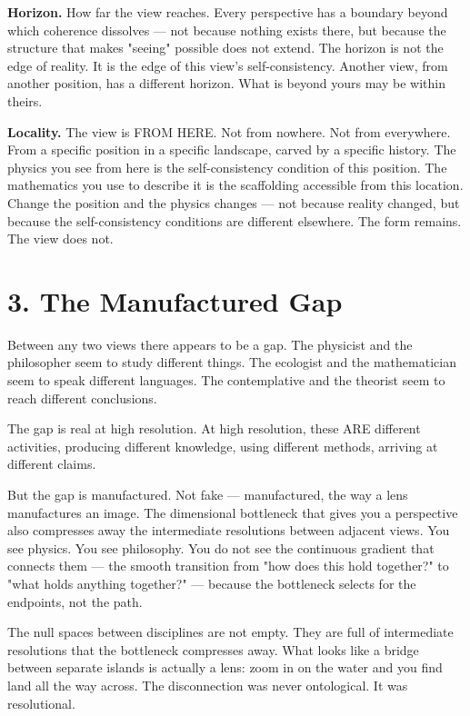 \textbf{Horizon.} How far the view reaches. Every perspective has a boundary beyond which coherence dissolves — not because nothing exists there, but because the structure that makes "seeing" possible does not extend. The horizon is not the edge of reality. It is the edge of this view's self-consistency. Another view, from another position, has a different horizon. What is beyond yours may be within theirs.


\textbf{Locality.} The view is FROM HERE. Not from nowhere. Not from everywhere. From a specific position in a specific landscape, carved by a specific history. The physics you see from here is the self-consistency condition of this position. The mathematics you use to describe it is the scaffolding accessible from this location. Change the position and the physics changes — not because reality changed, but because the self-consistency conditions are different elsewhere. The form remains. The view does not.


\section*{3. The Manufactured Gap}


Between any two views there appears to be a gap. The physicist and the philosopher seem to study different things. The ecologist and the mathematician seem to speak different languages. The contemplative and the theorist seem to reach different conclusions.


The gap is real at high resolution. At high resolution, these ARE different activities, producing different knowledge, using different methods, arriving at different claims.


But the gap is manufactured. Not fake — manufactured, the way a lens manufactures an image. The dimensional bottleneck that gives you a perspective also compresses away the intermediate resolutions between adjacent views. You see physics. You see philosophy. You do not see the continuous gradient that connects them — the smooth transition from "how does this hold together?" to "what holds anything together?" — because the bottleneck selects for the endpoints, not the path.


The null spaces between disciplines are not empty. They are full of intermediate resolutions that the bottleneck compresses away. What looks like a bridge between separate islands is actually a lens: zoom in on the water and you find land all the way across. The disconnection was never ontological. It was resolutional.


